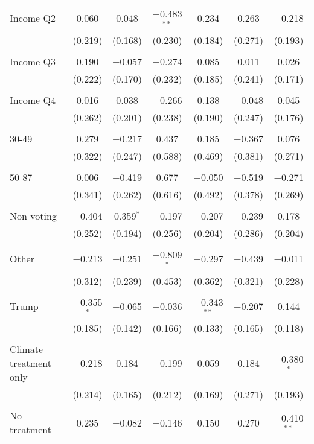 \begin{tabular}{@{\extracolsep{5pt}}lcccccc}
 Income Q2 & 0.060 & 0.048 & $-$0.483$^{**}$ & 0.234 & 0.263 & $-$0.218 \\ 
  & (0.219) & (0.168) & (0.230) & (0.184) & (0.271) & (0.193) \\ 
  & & & & & & \\ 
 Income Q3 & 0.190 & $-$0.057 & $-$0.274 & 0.085 & 0.011 & 0.026 \\ 
  & (0.222) & (0.170) & (0.232) & (0.185) & (0.241) & (0.171) \\ 
  & & & & & & \\ 
 Income Q4 & 0.016 & 0.038 & $-$0.266 & 0.138 & $-$0.048 & 0.045 \\ 
  & (0.262) & (0.201) & (0.238) & (0.190) & (0.247) & (0.176) \\ 
  & & & & & & \\ 
 30-49 & 0.279 & $-$0.217 & 0.437 & 0.185 & $-$0.367 & 0.076 \\ 
  & (0.322) & (0.247) & (0.588) & (0.469) & (0.381) & (0.271) \\ 
  & & & & & & \\ 
 50-87 & 0.006 & $-$0.419 & 0.677 & $-$0.050 & $-$0.519 & $-$0.271 \\ 
  & (0.341) & (0.262) & (0.616) & (0.492) & (0.378) & (0.269) \\ 
  & & & & & & \\ 
 Non voting & $-$0.404 & 0.359$^{*}$ & $-$0.197 & $-$0.207 & $-$0.239 & 0.178 \\ 
  & (0.252) & (0.194) & (0.256) & (0.204) & (0.286) & (0.204) \\ 
  & & & & & & \\ 
 Other & $-$0.213 & $-$0.251 & $-$0.809$^{*}$ & $-$0.297 & $-$0.439 & $-$0.011 \\ 
  & (0.312) & (0.239) & (0.453) & (0.362) & (0.321) & (0.228) \\ 
  & & & & & & \\ 
 Trump & $-$0.355$^{*}$ & $-$0.065 & $-$0.036 & $-$0.343$^{**}$ & $-$0.207 & 0.144 \\ 
  & (0.185) & (0.142) & (0.166) & (0.133) & (0.165) & (0.118) \\ 
  & & & & & & \\ 
 Climate treatment only & $-$0.218 & 0.184 & $-$0.199 & 0.059 & 0.184 & $-$0.380$^{*}$ \\ 
  & (0.214) & (0.165) & (0.212) & (0.169) & (0.271) & (0.193) \\ 
  & & & & & & \\ 
 No treatment & 0.235 & $-$0.082 & $-$0.146 & 0.150 & 0.270 & $-$0.410$^{**}$ \\ 

\end{tabular}

